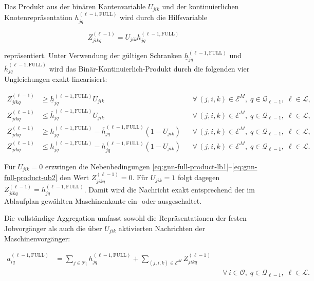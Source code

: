 Das Produkt aus der binären Kantenvariable $U_{jik}$ und der kontinuierlichen
Knotenrepräsentation $h_{jq}^{(\ell-1,\mathrm{FULL})}$ wird durch die
Hilfsvariable

\begin{equation}
Z_{jikq}^{(\ell-1)}
=
U_{jik}h_{jq}^{(\ell-1,\mathrm{FULL})}
\label{eq:gnn-full-product-definition}
\end{equation}

repräsentiert. Unter Verwendung der gültigen Schranken
$\underline{h}_{jq}^{(\ell-1,\mathrm{FULL})}$ und
$\overline{h}_{jq}^{(\ell-1,\mathrm{FULL})}$ wird das
Binär-Kontinuierlich-Produkt durch die folgenden vier Ungleichungen exakt
linearisiert:

\begin{align}
Z_{jikq}^{(\ell-1)}
&\ge
\underline{h}_{jq}^{(\ell-1,\mathrm{FULL})}U_{jik}
&&
\forall\,(j,i,k)\in\mathcal{E}^{M},\;
q\in\mathcal{Q}_{\ell-1},\;
\ell\in\mathcal{L},
\label{eq:gnn-full-product-lb1}
\\
Z_{jikq}^{(\ell-1)}
&\le
\overline{h}_{jq}^{(\ell-1,\mathrm{FULL})}U_{jik}
&&
\forall\,(j,i,k)\in\mathcal{E}^{M},\;
q\in\mathcal{Q}_{\ell-1},\;
\ell\in\mathcal{L},
\label{eq:gnn-full-product-ub1}
\\
Z_{jikq}^{(\ell-1)}
&\ge
h_{jq}^{(\ell-1,\mathrm{FULL})}
-
\overline{h}_{jq}^{(\ell-1,\mathrm{FULL})}(1-U_{jik})
&&
\forall\,(j,i,k)\in\mathcal{E}^{M},\;
q\in\mathcal{Q}_{\ell-1},\;
\ell\in\mathcal{L},
\label{eq:gnn-full-product-lb2}
\\
Z_{jikq}^{(\ell-1)}
&\le
h_{jq}^{(\ell-1,\mathrm{FULL})}
-
\underline{h}_{jq}^{(\ell-1,\mathrm{FULL})}(1-U_{jik})
&&
\forall\,(j,i,k)\in\mathcal{E}^{M},\;
q\in\mathcal{Q}_{\ell-1},\;
\ell\in\mathcal{L}.
\label{eq:gnn-full-product-ub2}
\end{align}

Für $U_{jik}=0$ erzwingen die Nebenbedingungen
\eqref{eq:gnn-full-product-lb1}--\eqref{eq:gnn-full-product-ub2} den Wert
$Z_{jikq}^{(\ell-1)}=0$. Für $U_{jik}=1$ folgt dagegen
$Z_{jikq}^{(\ell-1)}=h_{jq}^{(\ell-1,\mathrm{FULL})}$. Damit wird die
Nachricht exakt entsprechend der im Ablaufplan gewählten Maschinenkante ein-
oder ausgeschaltet.

Die vollständige Aggregation umfasst sowohl die Repräsentationen der festen
Jobvorgänger als auch die über $U_{jik}$ aktivierten Nachrichten der
Maschinenvorgänger:

\begin{align}
a_{iq}^{(\ell-1,\mathrm{FULL})}
&=
\sum_{j\in\mathcal{P}_i}
h_{jq}^{(\ell-1,\mathrm{FULL})}
+
\sum_{(j,i,k)\in\mathcal{E}^{M}}
Z_{jikq}^{(\ell-1)}
\nonumber\\
&&&
\forall\,i\in\mathcal{O},\;
q\in\mathcal{Q}_{\ell-1},\;
\ell\in\mathcal{L}.
\label{eq:gnn-full-aggregation}
\end{align}

